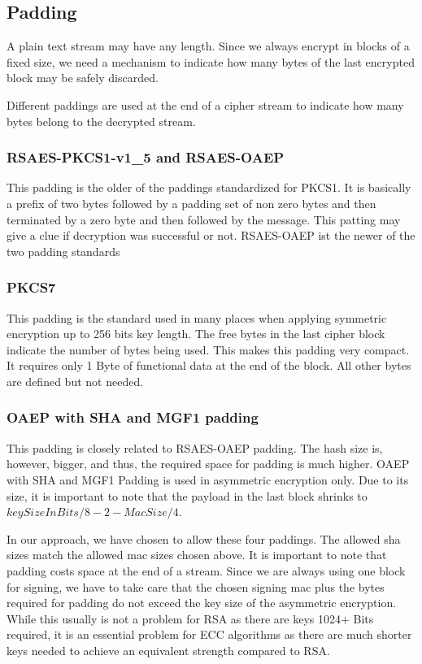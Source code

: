 \subsection{Padding}
A plain text stream may have any length. Since we always encrypt in blocks of a fixed size, we need a mechanism to indicate how many bytes of the last encrypted block may be safely discarded. 

Different paddings are used at the end of a cipher stream to indicate how many bytes belong to the decrypted stream.

\subsubsection{RSAES-PKCS1-v1\_5 and RSAES-OAEP}
This padding is the older of the paddings standardized for PKCS1. It is basically a prefix of two bytes followed by a padding set of non zero bytes and then terminated by a zero byte and then followed by the message. This patting may give a clue if decryption was successful or not. RSAES-OAEP ist the newer of the two padding standards 

\subsubsection{PKCS7} 
This padding is the standard used in many places when applying symmetric encryption up to 256 bits key length. The free bytes in the last cipher block indicate the number of bytes being used. This makes this padding very compact. It requires only 1 Byte of functional data at the end of the block. All other bytes are defined but not needed.

\subsubsection{OAEP with SHA and MGF1 padding} 
This padding is closely related to RSAES-OAEP padding. The hash size is, however, bigger, and thus, the required space for padding is much higher. OAEP with SHA and MGF1 Padding is used in asymmetric encryption only. Due to its size, it is important to note that the payload in the last block shrinks to $keySizeInBits/8-2-MacSize/4$.

In our approach, we have chosen to allow these four paddings. The allowed sha sizes match the allowed mac sizes chosen above. It is important to note that padding costs space at the end of a stream. Since we are always using one block for signing, we have to take care that the chosen signing mac plus the bytes required for padding do not exceed the key size of the asymmetric encryption. While this usually is not a problem for RSA as there are keys 1024+ Bits required, it is an essential problem for ECC algorithms as there are much shorter keys needed to achieve an equivalent strength compared to RSA. 


